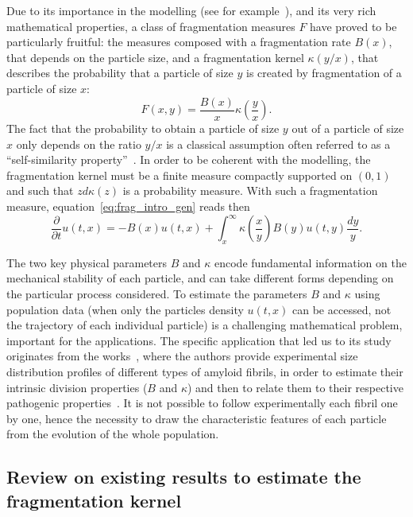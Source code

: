 \documentclass[10pt]{amsart}
\theoremstyle{definition}\newtheorem{defi}[theo]{Definition}\newtheorem{rema}[theo]{Remark}\newtheorem{exam}[theo]{Example}\newtheorem{exem}[theo]{Example}\newtheorem{nota}[theo]{Notation}
\newcommand*\dst{\displaystyle}
\newcommand*\p{\partial}
\newcommand*\f{\frac}
\begin{document}
Due to its importance in the modelling (see for example~\cite{Ram74,Val}), and its very rich mathematical properties, a class of fragmentation measures $F$ have proved to be particularly fruitful:
the measures composed with a fragmentation rate $B(x)$, that depends on the particle size, and a fragmentation kernel $\kappa (y/x)$, that describes the probability that a particle of size $y$ is created by fragmentation of a particle of size $x$:
\begin{equation}\label{eq:frag_intro_simF}
F(x, y)= \frac {B(x)} {x}\kappa\left(\frac {y} {x} \right).
\end{equation}
The fact that the probability to obtain a particle of size $y$ out of a particle of size $x$ only depends on the ratio $y/x$ is a classical assumption often referred to as a ``self-similarity property''~\cite{Bertoin1,BW,CCM}. In order to be coherent with the modelling, the fragmentation kernel must be a finite measure compactly supported on $(0, 1)$ and such that $zd\kappa(z)$ is a probability measure. With such a fragmentation measure, equation~\eqref{eq:frag_intro_gen} reads then
\begin{equation}\label{eq:frag_intro}
\dfrac{\p}{\p t}u(t,x) =- B(x)u(t,x) + \dst\int_{x}^{\infty}\kappa\left(\dfrac{x}{y} \right)B(y) u(t,y)\f{dy}{y}.
\end{equation}



The two key physical parameters $B$ and $\kappa$ encode fundamental information on the mechanical stability of each particle, and can take different forms depending on the particular process considered.
To estimate the parameters $B$ and $\kappa$ using population data (when only the particles density $u(t,x)$ can be accessed, not the trajectory of each individual particle) is a challenging mathematical  problem, important for the applications. The specific application that led us to its study originates from the works~\cite{XHR09,XR13}, where the authors provide experimental size distribution profiles of different types of amyloid fibrils, in order to estimate their intrinsic division properties ($B$ and $\kappa$) and then to relate them to their respective pathogenic properties~\cite{BTMPSTDX19}. It is not possible to follow experimentally each fibril one by one, hence the necessity to draw the characteristic features of each particle from the evolution of the whole population.


\subsection{Review on existing results to estimate the fragmentation kernel} \label{sec:review}
\end{document}
